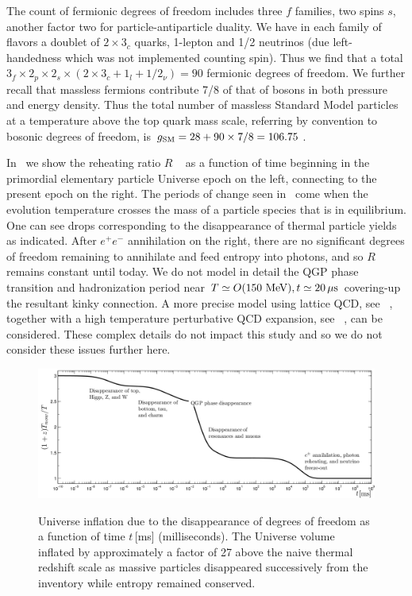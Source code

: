 The count of fermionic degrees of freedom includes three $f$ families, two spins $s$, another factor two for particle-antiparticle duality. We have in each family of flavors a doublet of $2\times 3_c$ quarks, 1-lepton and 1/2 neutrinos (due left-handedness which was not implemented counting spin). Thus we find that a total $3_f\times 2_p\times 2_s\times(2\times 3_c+1_l+1/2_\nu)=90$ fermionic degrees of freedom. We further recall that massless fermions contribute 7/8 of that of bosons in both pressure and energy density. Thus the total number of massless Standard Model particles at a temperature above the top quark mass scale, referring by convention to bosonic degrees of freedom, is $g_{\rm SM}=28+90\times 7/8=106.75$\,.

In~ we show the reheating ratio $R$ ~ as a function of time beginning in the primordial elementary particle Universe epoch on the left, connecting to the present epoch on the right. The periods of change seen in~ come when the evolution temperature crosses the mass of a particle species that is in equilibrium. One can see drops corresponding to the disappearance of thermal particle yields as indicated. After $e^+e^-$ annihilation on the right, there are no significant degrees of freedom remaining to annihilate and feed entropy into photons, and so $R$ remains constant until today. We do not model in detail the QGP phase transition and hadronization period near $T\simeq O(150\,\text{\,MeV}), t\simeq 20\,\mu\mathrm{s}$ covering-up the resultant kinky connection. A more precise model using lattice QCD, see \eg~\cite{Borsanyi:2013bia}, together with a high temperature perturbative QCD expansion, see \eg~\cite{Letessier:2002ony}, can be considered. These complex details do not impact this study and so we do not consider these issues further here.

\begin{figure}
{\includegraphics[width=\linewidth]{plots/DOFtime.png}}
\caption{Universe inflation due to the disappearance of degrees of freedom as a function of time $t$\,[ms] (milliseconds). The Universe volume inflated by approximately a factor of 27 above the naive thermal redshift scale as massive particles disappeared successively from the inventory while entropy remained conserved. }\label{fig:dof}
\end{figure}

